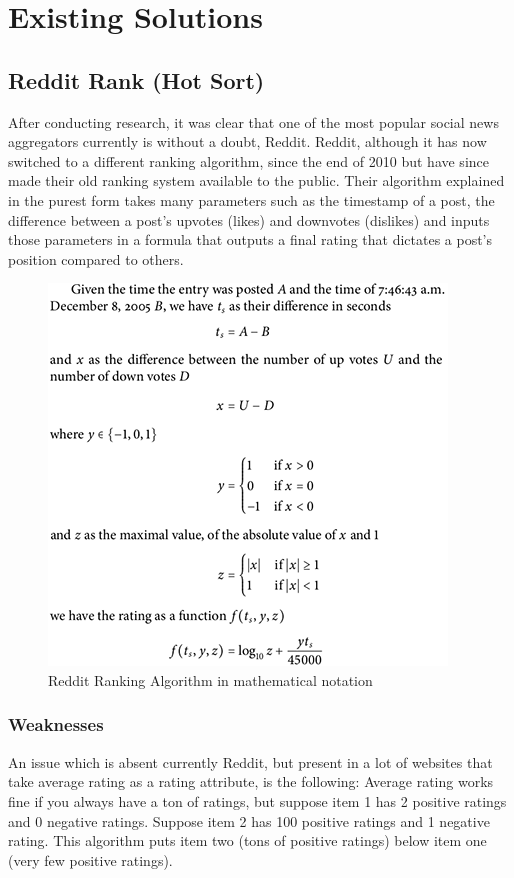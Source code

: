 \section{Existing Solutions}

\subsection {Reddit Rank (Hot Sort)}
After conducting research, it was clear that one of the most popular social news aggregators currently is without a doubt, Reddit. Reddit, although it has now switched to a different ranking algorithm, since the end of 2010 but have since made their old ranking system available to the public. Their algorithm explained in the purest form takes many parameters such as the timestamp of a post, the difference between a post’s upvotes (likes) and downvotes (dislikes) and inputs those parameters in a formula that outputs a final rating that dictates a post’s position compared to others.

\begin{figure}[!htb]
 \begin{center}
	 \includegraphics{Figures/reddit_rank.png}
 \end{center}
 \caption{Reddit Ranking Algorithm in mathematical notation}
\end{figure}


\subsubsection {Weaknesses}
An issue which is absent currently Reddit, but present in a lot of websites that take average rating as a rating attribute, is the following: Average rating works fine if you always have a ton of ratings, but suppose item 1 has 2 positive ratings and 0 negative ratings. Suppose item 2 has 100 positive ratings and 1 negative rating. This algorithm puts item two (tons of positive ratings) below item one (very few positive ratings).


